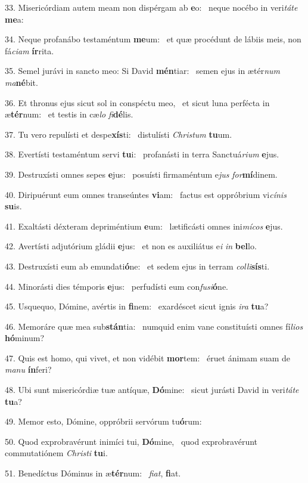33. Misericórdiam autem meam non dispérgam ab \textbf{e}o: \ast\  neque nocébo in veri\textit{tá}\textit{te} \textbf{me}a:\

34. Neque profanábo testaméntum \textbf{me}um: \ast\  et quæ procédunt de lábiis meis, non fá\textit{ci}\textit{am} \textbf{ír}rita.\

35. Semel jurávi in sancto meo: Si David \textbf{mén}tiar: \ast\  semen ejus in ætér\textit{num} \textit{ma}\textbf{né}bit.\

36. Et thronus ejus sicut sol in conspéctu meo, \dag\  et sicut luna perfécta in æ\textbf{tér}num: \ast\  et testis in cæ\textit{lo} \textit{fi}\textbf{dé}lis.\

37. Tu vero repulísti et despe\textbf{xís}ti: \ast\  distulísti \textit{Chris}\textit{tum} \textbf{tu}um.\

38. Evertísti testaméntum servi \textbf{tu}i: \ast\  profanásti in terra Sanctuá\textit{ri}\textit{um} \textbf{e}jus.\

39. Destruxísti omnes sepes \textbf{e}jus: \ast\  posuísti firmaméntum e\textit{jus} \textit{for}\textbf{mí}dinem.\

40. Diripuérunt eum omnes transeúntes \textbf{vi}am: \ast\  factus est oppróbrium vi\textit{cí}\textit{nis} \textbf{su}is.\

41. Exaltásti déxteram depriméntium \textbf{e}um: \ast\  lætificásti omnes ini\textit{mí}\textit{cos} \textbf{e}jus.\

42. Avertísti adjutórium gládii \textbf{e}jus: \ast\  et non es auxiliátus e\textit{i} \textit{in} \textbf{bel}lo.\

43. Destruxísti eum ab emundati\textbf{ó}ne: \ast\  et sedem ejus in terram \textit{col}\textit{li}\textbf{sís}ti.\

44. Minorásti dies témporis \textbf{e}jus: \ast\  perfudísti eum con\textit{fu}\textit{si}\textbf{ó}ne.\

45. Usquequo, Dómine, avértis in \textbf{fi}nem: \ast\  exardéscet sicut ignis \textit{i}\textit{ra} \textbf{tu}a?\

46. Memoráre quæ mea sub\textbf{stán}tia: \ast\  numquid enim vane constituísti omnes fí\textit{li}\textit{os} \textbf{hó}minum?\

47. Quis est homo, qui vivet, et non vidébit \textbf{mor}tem: \ast\  éruet ánimam suam de \textit{ma}\textit{nu} \textbf{ín}feri?\

48. Ubi sunt misericórdiæ tuæ antíquæ, \textbf{Dó}mine: \ast\  sicut jurásti David in veri\textit{tá}\textit{te} \textbf{tu}a?\

49. Memor esto, Dómine, oppróbrii servórum tu\textbf{ó}rum: \ast\  \

50. Quod exprobravérunt inimíci tui, \textbf{Dó}mine, \ast\  quod exprobravérunt commutatiónem \textit{Chris}\textit{ti} \textbf{tu}i.\

51. Benedíctus Dóminus in æ\textbf{tér}num: \ast\  \textit{fi}\textit{at}, \textbf{fi}at.\

